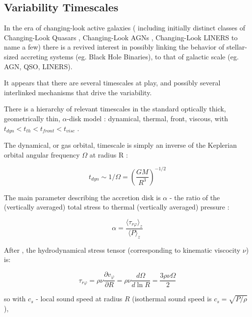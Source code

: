 \documentclass[twocolumn]{aastex62}
\begin{document}
\subsection{Variability Timescales}

In the era of changing-look active galaxies ( including initially distinct classes of Changing-Look Quasars \citep{lamassa2015, macleod2019}, Changing-Look AGNs \citep{marchese2012, bianchi2009,risaliti2009}, Changing-Look LINERS \citep{frederick2019} to name a few) there is a revived interest in possibly linking the behavior of stellar-sized accreting systems (eg. Black Hole Binaries),  to that of galactic scale (eg. AGN, QSO, LINERS)\citep{noda2018}. 

It appears that there are several timescales at play, and possibly several interlinked mechanisms that drive the variability. 

There is a hierarchy of relevant timescales in the standard optically thick, geometrically thin, $\alpha$-disk model : dynamical, thermal, front, viscous, with   $t_{dyn} < t_{th} < t_{front}  < t_{visc} $ \citep{netzer2013, frank2002}.

The dynamical, or gas orbital, timescale is simply  an inverse of the Keplerian orbital angular frequency $ \Omega$  at radius R  : 

\begin{equation}
t_{dyn} {\sim}  1 / \Omega = \left( \frac{GM}{R^{3}}\right)^{-1/2}
\end{equation}


The main parameter  describing the accretion disk is $\alpha$ - the ratio of the (vertically averaged) total stress to thermal (vertically averaged) pressure \citep{lasota2016} : 

\begin{equation}
\alpha= \frac{\langle \tau_{r\varphi}  \rangle_{z} }{\langle P \rangle _{z}} 
\end{equation}


After \cite{lasota2016},  the hydrodynamical stress tensor (corresponding to  kinematic viscocity $\nu$) is:

\begin{equation}
\tau_{r\varphi } = \rho \nu \frac{\partial v_{\varphi}}{\partial R} = \rho \nu \frac{d \Omega}{d \ln{R}} = \frac{3 \rho \nu \Omega}{2}  
\end{equation}

so  with  $c_{s}$ -  local sound speed at radius $R$ (isothermal sound speed is $c_{s} = \sqrt{P/\rho}$),
\end{document}
